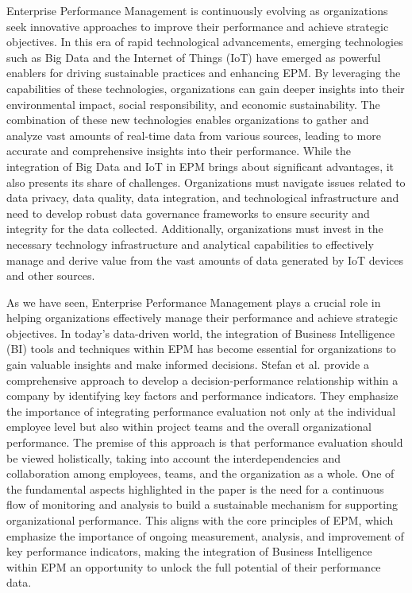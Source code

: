\documentclass[12pt,a4paper,openright,twoside]{book}
\begin{document}
Enterprise Performance Management is continuously evolving as organizations seek innovative approaches to improve their performance and achieve strategic objectives. 
%
In this era of rapid technological advancements, emerging technologies such as Big Data and the Internet of Things (IoT) have emerged as powerful enablers for driving sustainable practices and enhancing EPM. 
%
By leveraging the capabilities of these technologies, organizations can gain deeper insights into their environmental impact, social responsibility, and economic sustainability.\cite{yang2023bigdata}
%
The combination of these new technologies enables organizations to gather and analyze vast amounts of real-time data from various sources, leading to more accurate and comprehensive insights into their performance.
%
While the integration of Big Data and IoT in EPM brings about significant advantages, it also presents its share of challenges. 
%
Organizations must navigate issues related to data privacy, data quality, data integration, and technological infrastructure and need to develop robust data governance frameworks to ensure security and integrity for the data collected. 
%
Additionally, organizations must invest in the necessary technology infrastructure and analytical capabilities to effectively manage and derive value from the vast amounts of data generated by IoT devices and other sources.

As we have seen, Enterprise Performance Management plays a crucial role in helping organizations effectively manage their performance and achieve strategic objectives. 
%
In today's data-driven world, the integration of Business Intelligence (BI) tools and techniques within EPM has become essential for organizations to gain valuable insights and make informed decisions. 
%
Stefan et al.\cite{stefan2010enterprise} provide a comprehensive approach to develop a decision-performance relationship within a company by identifying key factors and performance indicators. 
%
They emphasize the importance of integrating performance evaluation not only at the individual employee level but also within project teams and the overall organizational performance. 
%
The premise of this approach is that performance evaluation should be viewed holistically, taking into account the interdependencies and collaboration among employees, teams, and the organization as a whole.
%
One of the fundamental aspects highlighted in the paper is the need for a continuous flow of monitoring and analysis to build a sustainable mechanism for supporting organizational performance. 
%
This aligns with the core principles of EPM, which emphasize the importance of ongoing measurement, analysis, and improvement of key performance indicators, making the integration of Business Intelligence within EPM an opportunity to unlock the full potential of their performance data. 
\end{document}
